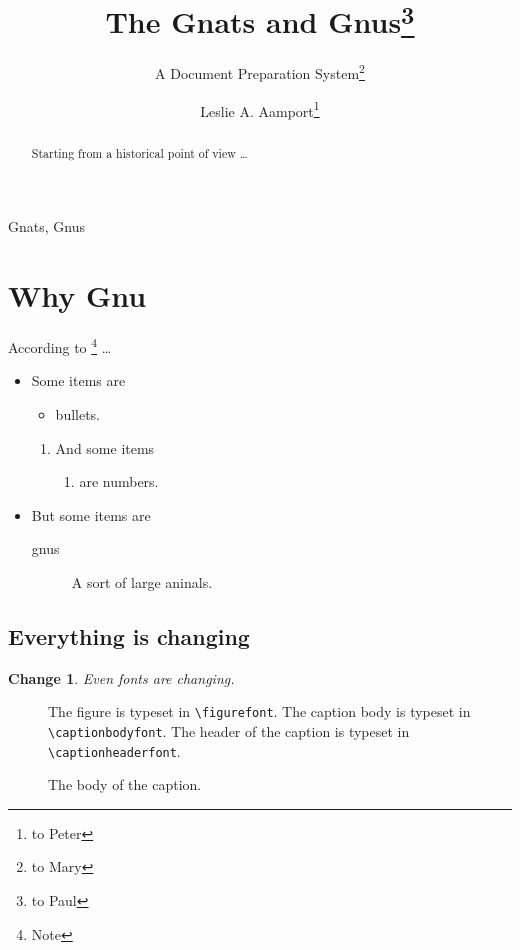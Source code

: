 \documentclass[sfbold,]{paper}
\begin{document}
 \author{Leslie A. Aamport\thanks{to Peter}}
 \title{The Gnats and Gnus\thanks{to Paul}}
 \subtitle{A Document Preparation System\thanks{to Mary}}

\maketitle

 \begin{abstract}
   Starting from a historical point of view \dots
 \end{abstract}
 
 \begin{keywords}
   Gnats, Gnus
 \end{keywords}
 


\section{Why Gnu}

According to \cite{book-full}\footnote{Note} \dots

\begin{itemize}
\item Some items are 
  \begin{itemize}
  \item bullets.
  \end{itemize}
  \begin{enumerate}
  \item And some items 
    \begin{enumerate}
    \item are numbers.
    \end{enumerate}
  \end{enumerate}
\item But some items are
  \begin{description}
  \item[gnus] A sort of large aninals.
  \end{description}
\end{itemize}


\subsection{Everything is changing}

\newtheorem{change}{Change}

\begin{change}
  Even fonts are changing.
\end{change}


\begin{figure}[htbp]
  \begin{center}
    \leavevmode
    The figure is typeset in \verb|\figurefont|.
    The caption body is typeset in \verb|\captionbodyfont|.
    The header of the caption is typeset in \verb|\captionheaderfont|.
  \end{center}
  \caption{The body of the caption.}
\end{figure}




\end{document}
